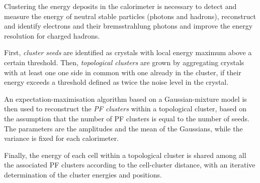 \label{sec:clusters}
Clustering the energy deposits in the calorimeter is necessary to
detect and measure the energy of neutral stable particles (photons and hadrons),
reconstruct and identify electrons and their bremsstrahlung photons
and improve the energy resolution for charged hadrons.

First, \textit{cluster seeds} are identified as crystals with local energy maximum above a certain threshold.
Then, \textit{topological clusters} are grown by aggregating crystals with at least one one side in common with one already in the cluster,
if their energy exceeds a threshold defined as twice the noise level in the crystal.

An expectation-maximisation algorithm based on a Gaussian-mixture model is then used to reconstruct the \textit{PF clusters} within a topological cluster,
based on the assumption that the number of PF clusters is equal to the number of seeds.
The parameters are the amplitudes and the mean of the Gaussians, while the variance is fixed for each calorimeter.

Finally, the energy of each cell within a topological cluster is shared among all the associated PF clusters according to the cell-cluster distance,
with an iterative determination of the cluster energies and positions.
